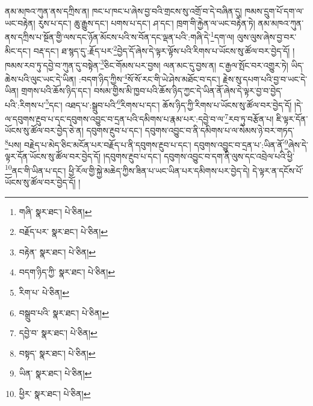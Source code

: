ནམ་མཁའ་ཀུན་ནས་དཀྲིས་ན། ཁང་པ་ཁང་པ་ཞེས་བྱ་བའི་གྲངས་སུ་འགྲོ་བ་དེ་བཞིན་དུ། ཁམས་དྲུག་པོ་དག་ལ་ཡང་བརྟེན། རུས་པ་དང་། ཆུ་རྒྱུས་དང་། པགས་པ་དང་། ཤ་དང་། ཁྲག་གི་རྐྱེན་ལ་ཡང་བརྟེན་ཏེ། ནམ་མཁའ་ཀུན་ནས་དཀྲིས་པ་སྔོན་གྱི་ལས་དང་ཉོན་མོངས་པའི་ས་བོན་དང་ལྡན་པའི་:གཞི་དེ་\footnote{གཞི་  སྣར་ཐང་།  པེ་ཅིན། }དག་ལ། ལུས་ལུས་ཞེས་བྱ་བར་མིང་དང་། བརྡ་དང་། ཐ་སྙད་དུ་:རྗོད་པར་\footnote{བརྗོད་པར་  སྣར་ཐང་།  པེ་ཅིན། }བྱེད་དོ་ཞེས་དེ་ལྟར་ལྟོས་པའི་རིགས་པ་ཡོངས་སུ་ཚོལ་བར་བྱེད་དོ། །ཁམས་རབ་ཏུ་དབྱེ་བ་ཀུན་དུ་བསྟེན་\footnote{བརྟེན་  སྣར་ཐང་།  པེ་ཅིན། }ཅིང་གོམས་པར་བྱས། ལན་མང་དུ་བྱས་ན། ང་རྒྱལ་སྤོང་བར་འགྱུར་ཏེ། ཡིད་ཆེས་པའི་ལུང་ཡང་དེ་ཡིན། :བདག་ཉིད་ཀྱིས་\footnote{བདག་ཉིད་ཀྱི་  སྣར་ཐང་།  པེ་ཅིན། }སོ་སོ་རང་གི་ཡེ་ཤེས་མཐོང་བ་དང་། རྗེས་སུ་དཔག་པའི་བྱ་བ་ཡང་དེ་ཡིན། གྲགས་པའི་ཆོས་ཉིད་དང་། བསམ་གྱིས་མི་ཁྱབ་པའི་ཆོས་ཉིད་ཀྱང་དེ་ཡིན་ནོ་ཞེས་དེ་ལྟར་བྱ་བ་བྱེད་པའི་:རིགས་པ་\footnote{རིག་པ་  པེ་ཅིན། }དང་། འཐད་པ་:སྒྲུབ་པའི་\footnote{བསྒྲུབ་པའི་  སྣར་ཐང་།  པེ་ཅིན། }རིགས་པ་དང་། ཆོས་ཉིད་ཀྱི་རིགས་པ་ཡོངས་སུ་ཚོལ་བར་བྱེད་དོ། །དེ་ལ་དབུགས་རྔུབ་པ་དང་དབུགས་འབྱུང་བ་དྲན་པའི་དམིགས་པ་རྣམ་པར་:དབྱེ་བ་ལ་\footnote{དབྱེ་བ་  སྣར་ཐང་།  པེ་ཅིན། }རབ་ཏུ་བརྩོན་པ། ཇི་ལྟར་དོན་ཡོངས་སུ་ཚོལ་བར་བྱེད་ཅེ་ན། དབུགས་རྔུབ་པ་དང་། དབུགས་འབྱུང་བ་ནི་དམིགས་པ་ལ་སེམས་ཉེ་བར་གཏད་\footnote{བསྟད་  སྣར་ཐང་།  པེ་ཅིན། }པས། བརྗེད་པ་མེད་ཅིང་མངོན་པར་བརྗོད་པ་ནི་དབུགས་རྔུབ་པ་དང་། དབུགས་འབྱུང་བ་དྲན་པ་:ཡིན་ནོ་\footnote{ཡིན་  སྣར་ཐང་།  པེ་ཅིན། }ཞེས་དེ་ལྟར་དོན་ཡོངས་སུ་ཚོལ་བར་བྱེད་དོ། །དབུགས་རྔུབ་པ་དང་། དབུགས་འབྱུང་བ་དག་ནི་ལུས་དང་འབྲེལ་པའི་ཕྱི་\footnote{ཕྱིར་  སྣར་ཐང་།  པེ་ཅིན། }ནང་གི་ཡིན་པ་དང་། ཕྱི་རོལ་གྱི་སྐྱེ་མཆེད་ཀྱིས་ཟིན་པ་ཡང་ཡིན་པར་དམིགས་པར་བྱེད་དེ། དེ་ལྟར་ན་དངོས་པོ་ཡོངས་སུ་ཚོལ་བར་བྱེད་དོ། །
